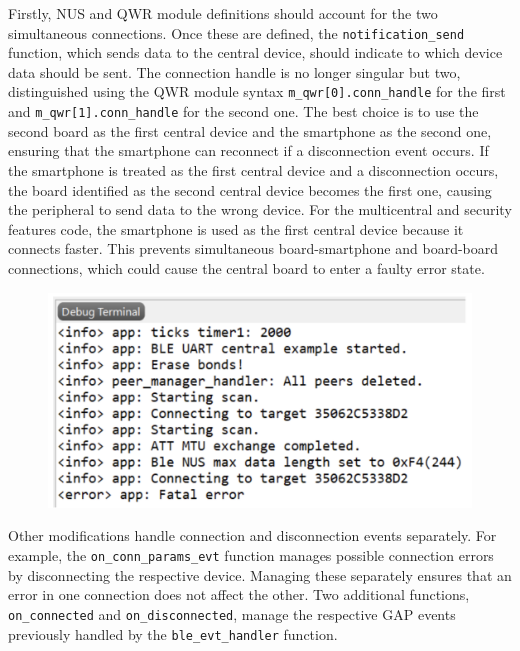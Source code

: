 \documentclass{Configuration_Files/PoliMi3i_thesis}
\begin{document}
Firstly, NUS and QWR module definitions should account for the two simultaneous connections. Once these are defined, the \texttt{notification\_send} function, which sends data to the central device, should indicate to which device data should be sent. The connection handle is no longer singular but two, distinguished using the QWR module syntax \texttt{m\_qwr[0].conn\_handle} for the first and \texttt{m\_qwr[1].conn\_handle} for the second one. The best choice is to use the second board as the first central device and the smartphone as the second one, ensuring that the smartphone can reconnect if a disconnection event occurs. If the smartphone is treated as the first central device and a disconnection occurs, the board identified as the second central device becomes the first one, causing the peripheral to send data to the wrong device. For the multicentral and security features code, the smartphone is used as the first central device because it connects faster. This prevents simultaneous board-smartphone and board-board connections, which could cause the central board to enter a faulty error state.

\begin{figure}[H]
    \centering
    \includegraphics[scale=0.3]{Multicentral/5.png}
    \label{fig:faulty_error_state_central_board}
\end{figure}

Other modifications handle connection and disconnection events separately. For example, the \texttt{on\_conn\_params\_evt} function manages possible connection errors by disconnecting the respective device. Managing these separately ensures that an error in one connection does not affect the other. Two additional functions, \texttt{on\_connected} and \texttt{on\_disconnected}, manage the respective GAP events previously handled by the \texttt{ble\_evt\_handler} function.
\end{document}
